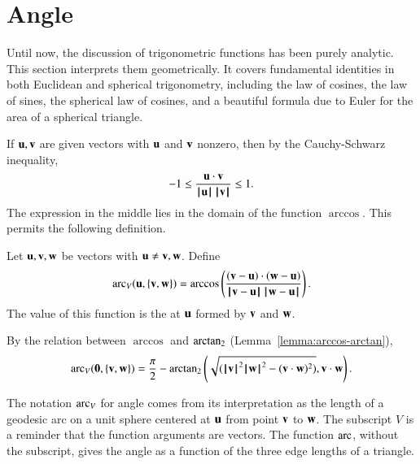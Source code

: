 \section{Angle}\label{sec:angle}

Until now, the discussion of trigonometric functions has been purely
analytic.  This section interprets them geometrically.  It covers
fundamental identities in both Euclidean and spherical trigonometry,
including the law of cosines, the law of sines, the spherical law of
cosines, and a beautiful formula due to Euler for the area of a
spherical triangle.

If ${\mathbf u},{\mathbf v}$ are given vectors with ${\mathbf u}$ and ${\mathbf v}$ nonzero, then by the
Cauchy-Schwarz inequality,
\begin{displaymath}-1 \le \frac{{\mathbf u}\cdot {\mathbf v}}{{{\hskip0.1em|\hskip-0.15em|\hskip0.1em}{\mathbf u}{\hskip0.1em|\hskip-0.15em|\hskip0.1em}}\,{{\hskip0.1em|\hskip-0.15em|\hskip0.1em}{\mathbf v}{\hskip0.1em|\hskip-0.15em|\hskip0.1em}}}
  \le 1.\end{displaymath} The expression in the middle lies in the
domain of the function $\arccos$. This permits the following
definition.  %
%
%

\begin{definition}\label{def:angle}
Let ${\mathbf u},{\mathbf v},{\mathbf w}$ be vectors with ${\mathbf u}\ne {\mathbf v},{\mathbf w}$.
Define 
\begin{displaymath}
  \arc_V(\u,\{\v,\w\}) = \arccos\left(\frac{(\v-\u)\cdot 
(\w-\u)}{\norm{\v}{\u}\,\norm{\w}{\u}}\right).
\end{displaymath}
The value of this function is the  at ${\mathbf u}$ formed by
${\mathbf v}$ and ${\mathbf w}$.  %
%
%
%
%
\end{definition}

By the relation between $\arccos$ and ${\operatorname{arctan_2}}$
(Lemma~\ref{lemma:arccos-arctan}), %
\begin{equation}\label{eqn:angle}
  \operatorname{arc}_V({\mathbf 0},\{{\mathbf v},{\mathbf w}\}) = \frac{\pi}2 - {\operatorname{arctan_2}}\left ({\sqrt{({{\hskip0.1em|\hskip-0.15em|\hskip0.1em}{\mathbf v}{\hskip0.1em|\hskip-0.15em|\hskip0.1em}}^2{{\hskip0.1em|\hskip-0.15em|\hskip0.1em}{\mathbf w}{\hskip0.1em|\hskip-0.15em|\hskip0.1em}}^2 -
        ({\mathbf v}\cdot {\mathbf w})^2)}}, {{\mathbf v}\cdot {\mathbf w}}\right).
\end{equation}
%

The notation $\operatorname{arc}_V$ for angle comes from its interpretation as the
length of a geodesic arc on a unit sphere
centered at ${\mathbf u}$ from point ${\mathbf v}$ to ${\mathbf w}$.
%
The subscript $V$ is a reminder that
the function arguments are vectors.  The function
$\operatorname{arc}$, without the subscript,  gives the angle as a function
of the three edge lengths of a triangle.
%
%
%

